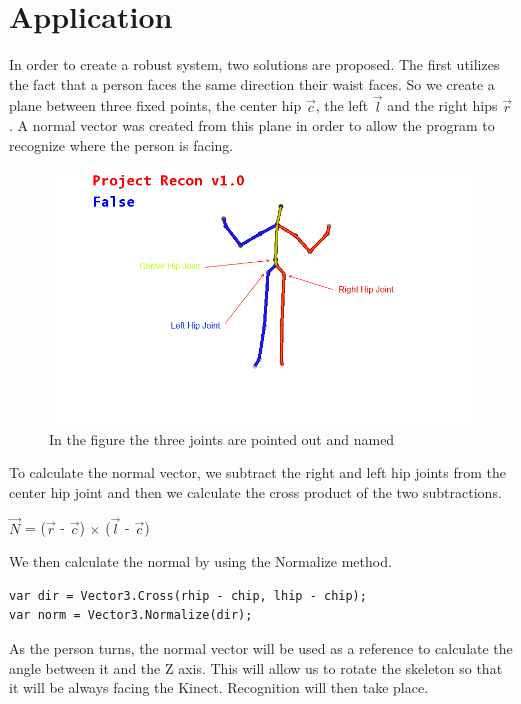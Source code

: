 \chapter{Application}\label{chap:application}
In order to create a robust system, two solutions are proposed. The first utilizes the fact that a person faces 
the same direction their waist faces. So we create a plane between three fixed 
points, the center hip $\vec{c}$, the left $\vec{l}$ and the right hips $\vec{r}$. A normal vector \N was created 
from this plane in order to allow the program to recognize where the person is 
facing.

\begin{figure}[!htbp]
\centering
\includegraphics[width=1\textwidth]{images/skeleton_frame3.png}
\caption{In the figure the three joints are pointed out and named}
\label{skeletonframe3}
\end{figure}

To calculate the normal vector, we subtract the right and left hip joints from 
the center hip joint and then we calculate the cross product of the two 
subtractions.

$\vec{N}$ = ($\vec{r}$ - $\vec{c}$) $\times$ ($\vec{l}$ - $\vec{c}$)

We then calculate the normal by using the Normalize method.

\begin{verbatim}
var dir = Vector3.Cross(rhip - chip, lhip - chip);
var norm = Vector3.Normalize(dir);
\end{verbatim}

As the person turns, the normal vector will be used as a reference to calculate the angle between it and the Z axis. This will allow us to rotate the skeleton so that it will be always facing the Kinect. Recognition will then take place.

